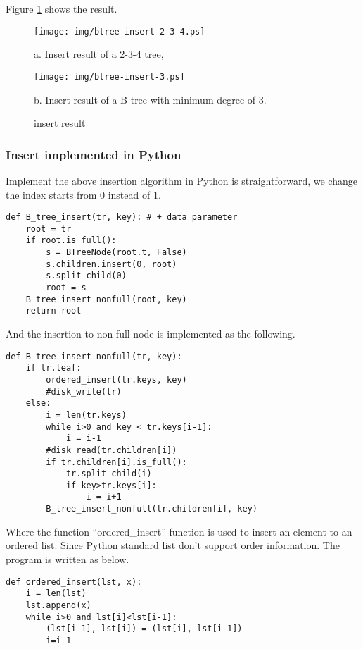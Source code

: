 \documentclass{article}
\begin{document}
Figure \ref{fig:btree-insert} shows the result.

\begin{figure}[htbp]
  \begin{center}
    \texttt{[image: img/btree-insert-2-3-4.ps]}

    a. Insert result of a 2-3-4 tree,

    \texttt{[image: img/btree-insert-3.ps]}

    b. Insert result of a B-tree with minimum degree of 3.
    \caption{insert result} \label{fig:btree-insert}
  \end{center}
\end{figure}

\subsubsection*{Insert implemented in Python}
Implement the above insertion algorithm in Python is straightforward, we change
the index starts from 0 instead of 1.

\lstset{language=Python}
\begin{lstlisting}
def B_tree_insert(tr, key): # + data parameter
    root = tr
    if root.is_full():
        s = BTreeNode(root.t, False)
        s.children.insert(0, root)
        s.split_child(0)
        root = s
    B_tree_insert_nonfull(root, key)
    return root
\end{lstlisting}

And the insertion to non-full node is implemented as the following.

\begin{lstlisting}
def B_tree_insert_nonfull(tr, key):
    if tr.leaf:
        ordered_insert(tr.keys, key)
        #disk_write(tr)
    else:
        i = len(tr.keys)
        while i>0 and key < tr.keys[i-1]:
            i = i-1
        #disk_read(tr.children[i])
        if tr.children[i].is_full():
            tr.split_child(i)
            if key>tr.keys[i]:
                i = i+1
        B_tree_insert_nonfull(tr.children[i], key)
\end{lstlisting}

Where the function ``ordered\_insert'' function is used to insert an element
to an ordered list. Since Python standard list don't support order information.
The program is written as below.

\begin{lstlisting}
def ordered_insert(lst, x):
    i = len(lst)
    lst.append(x)
    while i>0 and lst[i]<lst[i-1]:
        (lst[i-1], lst[i]) = (lst[i], lst[i-1])
        i=i-1
\end{lstlisting}
\end{document}
